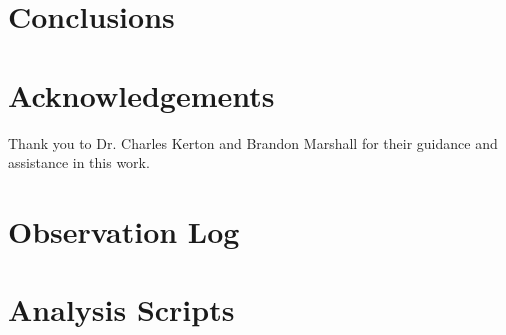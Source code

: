 \documentclass[%
aip,
jmp,
reprint,
floatfix
]{revtex4-1}
\begin{document}
	\section{Conclusions}



	\section*{Acknowledgements}

	Thank you to Dr. Charles Kerton and Brandon Marshall for their guidance and assistance in this work.




	\onecolumngrid
	\appendix
	\section{Observation Log}

	\begin{table}[h!]
		\centering
		
		\label{table:log}
	\end{table}

	\section{Analysis Scripts}
\end{document}
